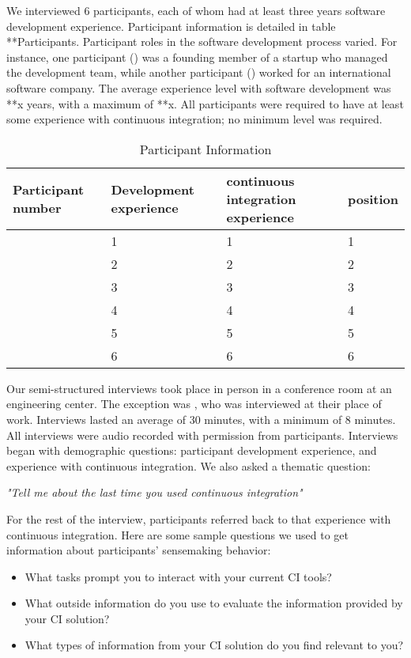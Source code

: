 \documentclass{sig-alternate}
\begin{document}
We interviewed 6 participants, each of whom had at least three years software development experience. Participant information is detailed in table **Participants. Participant roles in the software development process varied. For instance, one participant (\cpg) was a founding member of a startup who managed the development team, while another participant (\david) worked for an international software company. The average experience level with software development was **x years, with a maximum of **x. All participants were required to have at least some experience with continuous integration; no minimum level was required.
\begin{table}
\centering
\caption{Participant Information}
\begin{tabular}{ | p{} | p{} | p{} | p{} | }\hline
	Participant number & Development experience & continuous integration experience & position \\ \hline
	\michael & 1 & 1 & 1 \\ \hline
	\sruti & 2 & 2 & 2 \\ \hline
	\caius & 3 & 3 & 3 \\ \hline
	\srutitwo & 4 & 4 & 4 \\ \hline
	\david & 5 & 5 & 5 \\ \hline
	\cpg & 6 & 6 & 6 \\ \hline
\end{tabular}
\end{table}
Our semi-structured interviews took place in person in a conference room at an engineering center. The exception was \cpg, who was interviewed at their place of work. Interviews lasted an average of 30 minutes, with a minimum of 8 minutes. All interviews were audio recorded with permission from participants.  Interviews began with demographic questions: participant development experience, and experience with continuous integration. We also asked a thematic question:

\smallskip
\textit{"Tell me about the last time you used continuous integration"}


For the rest of the interview, participants referred back to that experience with continuous integration. Here are some sample questions we used to get information about participants' sensemaking behavior:
\begin{itemize}  
	\item What tasks prompt you to interact with your current CI tools?
	\item What outside information do you use to evaluate the information provided by your CI solution?
	\item What types of information from your CI solution do you find relevant to you? 
\end{itemize}
\end{document}
